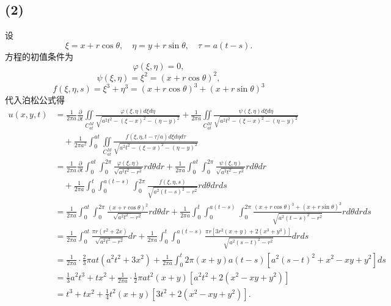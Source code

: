 \documentclass[11pt,a4paper]{article}
\begin{document}
\subsection*{(2)}
设
$$\xi=x+r\cos\theta,\quad \eta=y+r\sin\theta,\quad\tau=a(t-s).$$
方程的初值条件为
$$\varphi(\xi,\eta)=0,$$
$$\psi(\xi,\eta)=\xi^2=(x+r\cos\theta)^2,$$
$$f(\xi,\eta,s)=\xi^3+\eta^3=(x+r\cos\theta)^3+(x+r\sin\theta)^3$$
代入泊松公式得
\begin{align*}
  u(x,y,t)
   & =\frac{1}{2\pi a}\frac{\partial}{\partial t}\iint\limits_{C_{at}^M}\frac{\varphi(\xi,\eta)d\xi d\eta}{\sqrt{a^2t^2-(\xi-x)^2-(\eta-y)^2}}+
  \frac{1}{2\pi a}\iint\limits_{C_{at}^M}\frac{\psi(\xi,\eta)d\xi d\eta}{\sqrt{a^2t^2-(\xi-x)^2-(\eta-y)^2}}                                                       \\
   & \quad +\frac{1}{2\pi a^2}\int_0^{at}   \iint\limits_{C_{at}^M}\frac{f(\xi,\eta,t-\tau/a)d\xi d\eta d\tau}{\sqrt{a^2t^2-(\xi-x)^2-(\eta-y)^2}}                 \\
   & =\frac{1}{2\pi a}\frac{\partial}{\partial t}\int_0^{at}\int_0^{2\pi}\frac{\varphi(\xi,\eta)}{\sqrt{a^2t^2-r^2}}rd\theta dr+
  \frac{1}{2\pi a}\int_0^{at}\int_0^{2\pi}\frac{\psi(\xi,\eta)}{\sqrt{a^2t^2-r^2}}rd\theta dr                                                                      \\
   & \quad + \frac{1}{2\pi a}\int_0^{t}   \int_0^{a(t-s)}\int_0^{2\pi}\frac{f(\xi,\eta,s)}{\sqrt{a^2(t-s)^2-r^2}} rd\theta drds                                    \\
   & =\frac{1}{2\pi a}\int_0^{at}\int_0^{2\pi}\frac{(x+r\cos\theta)^2}{\sqrt{a^2t^2-r^2}}rd\theta dr+
  \frac{1}{2\pi a}\int_0^{t}\int_0^{a(t-s)}\int_0^{2\pi}\frac{(x+r\cos\theta)^3+(x+r\sin\theta)^3}{\sqrt{a^2(t-s)^2-r^2}} rd\theta drds
  \\
   & =\frac{1}{2\pi a}\int_0^{at} \frac{\pi r (r^2+2x)}{\sqrt{a^2 t^2-r^2}} dr+
  \frac{1}{2\pi a}\int_0^{t}\int_0^{a(t-s)}\frac{\pi  r \left[3 r^2 (x+y)+2 \left(x^3+y^3\right)\right]}{\sqrt{a^2 (s-t)^2-r^2}}drds                               \\
   & =\frac{1}{2\pi a}\cdot\frac{2}{3} \pi  a t \left(a^2 t^2+3 x^2\right)+   \frac{1}{2\pi a}\int_0^t 2 \pi  (x+y) a(t-s) \left[a^2 (s-t)^2+x^2-x y+y^2\right] ds \\
   & =\frac{1}{3}a^2 t^3+t x^2+\frac{1}{2\pi a}\cdot \frac{1}{2} \pi a t^2 (x+y) \left[a^2 t^2+2 \left(x^2-x y+y^2\right)\right]                                   \\
   & = t^3+t x^2+\frac{1}{4}t^2 (x+y) \left[3 t^2+2 \left(x^2-x y+y^2\right)\right].
\end{align*}
\end{document}
